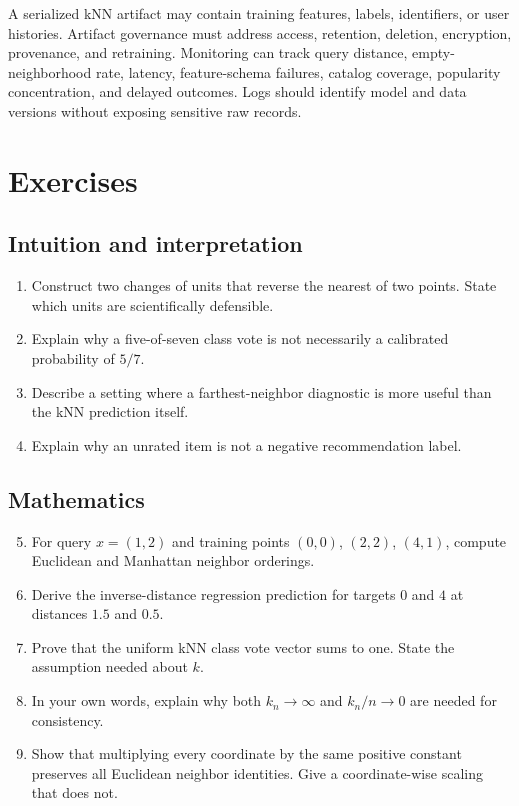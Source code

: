 A serialized kNN artifact may contain training features, labels, identifiers,
or user histories. Artifact governance must address access, retention,
deletion, encryption, provenance, and retraining. Monitoring can track query
distance, empty-neighborhood rate, latency, feature-schema failures, catalog
coverage, popularity concentration, and delayed outcomes. Logs should identify
model and data versions without exposing sensitive raw records.

\section{Exercises}

\subsection*{Intuition and interpretation}
\begin{enumerate}
  \item Construct two changes of units that reverse the nearest of two points.
  State which units are scientifically defensible.
  \item Explain why a five-of-seven class vote is not necessarily a calibrated
  probability of $5/7$.
  \item Describe a setting where a farthest-neighbor diagnostic is more useful
  than the kNN prediction itself.
  \item Explain why an unrated item is not a negative recommendation label.
\end{enumerate}

\subsection*{Mathematics}
\begin{enumerate}
  \setcounter{enumi}{4}
  \item For query $x=(1,2)$ and training points $(0,0)$, $(2,2)$, $(4,1)$,
  compute Euclidean and Manhattan neighbor orderings.
  \item Derive the inverse-distance regression prediction for targets
  $0$ and $4$ at distances $1.5$ and $0.5$.
  \item Prove that the uniform kNN class vote vector sums to one. State the
  assumption needed about $k$.
  \item In your own words, explain why both $k_n\to\infty$ and $k_n/n\to0$ are
  needed for consistency.
  \item Show that multiplying every coordinate by the same positive constant
  preserves all Euclidean neighbor identities. Give a coordinate-wise scaling
  that does not.
\end{enumerate}

